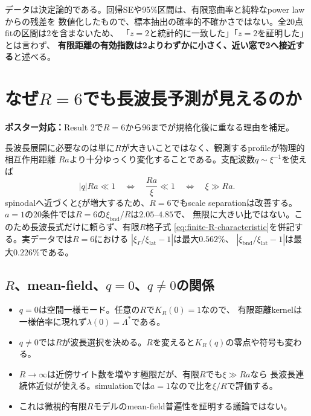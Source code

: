 \documentclass[a4paper,12pt]{ltjsarticle}
\newcommand{\PosterMap}[1]{%
  \begin{tcolorbox}[enhanced,boxrule=0pt,arc=1mm,colback=softgray,
    left=2mm,right=2mm,top=1mm,bottom=1mm,before skip=0pt,after skip=0.7em]
  \normalsize\textbf{ポスター対応：}#1
  \end{tcolorbox}}
\newcommand{\Caution}[1]{%
  \begin{tcolorbox}[enhanced,breakable,colback=softblue,colframe=navy,
    boxrule=0.6pt,arc=1.2mm,left=3mm,right=3mm,top=2mm,bottom=2mm,
    title=主張の範囲,fonttitle=\bfseries]
  #1
  \end{tcolorbox}}
\newcommand{\bnd}{\mathrm{bnd}}
\begin{document}
\Caution{
  データは決定論的である。回帰SEや95\%区間は、有限窓曲率と純粋なpower lawからの残差を
  数値化したもので、標本抽出の確率的不確かさではない。全20点fitの区間は2を含まないため、
  「$z=2$と統計的に一致した」「$z=2$を証明した」とは言わず、
  \textbf{有限距離の有効指数は2よりわずかに小さく、近い窓で2へ接近する}と述べる。
}

\section{なぜ\texorpdfstring{$R=6$}{R = 6}でも長波長予測が見えるのか}\label{sec:R6}
\PosterMap{Result 2で$R=6$から$96$までが規格化後に重なる理由を補足。}

長波長展開に必要なのは単に$R$が大きいことではなく、観測するprofileが物理的相互作用距離
$Ra$より十分ゆっくり変化することである。支配波数$q\sim\xi^{-1}$を使えば
\begin{equation}
 |q|Ra\ll1
 \quad\Longleftrightarrow\quad
 \frac{Ra}{\xi}\ll1
 \quad\Longleftrightarrow\quad
 \xi\gg Ra.
 \label{eq:scale-separation}
\end{equation}
spinodalへ近づくと$\xi$が増大するため、$R=6$でもscale separationは改善する。
$a=1$の20条件では$R=6$の$\xi_{\bnd}/R$は$2.05$--$4.85$で、
無限に大きい比ではない。このため長波長式だけに頼らず、有限$R$格子式
\eqref{eq:finite-R-characteristic}を併記する。実データでは$R=6$における
$|\xi_{\Gamma}/\xi_{\mathrm{lat}}-1|$は最大$0.562\%$、
$|\xi_{\bnd}/\xi_{\mathrm{lat}}-1|$は最大$0.226\%$である。

\subsection{\texorpdfstring{$R$}{R}、mean-field、\texorpdfstring{$q=0$}{q = 0}、\texorpdfstring{$q\neq0$}{q not equal to 0}の関係}

\begin{itemize}
 \item $q=0$は空間一様モード。任意の$R$で$K_R(0)=1$なので、
 有限距離kernelは一様倍率に現れず$\lambda(0)=\Lambda^*$である。
 \item $q\neq0$では$R$が波長選択を決める。$R$を変えると$K_R(q)$の零点や符号も変わる。
 \item $R\to\infty$は近傍サイト数を増やす極限だが、有限$R$でも$\xi\gg Ra$なら
 長波長連続体近似が使える。simulationでは$a=1$なので比を$\xi/R$で評価する。
 \item これは微視的有限$R$モデルのmean-field普遍性を証明する議論ではない。
\end{itemize}
\end{document}

